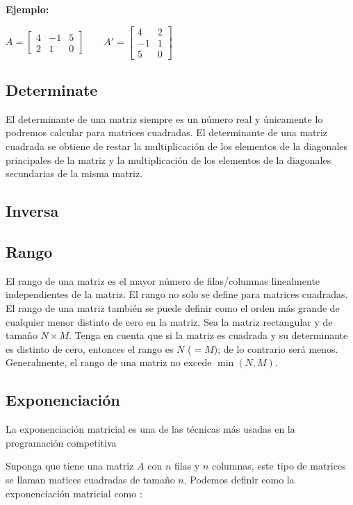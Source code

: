 \textbf{Ejemplo:}

$A=\begin{bmatrix} 
	4  & -1 & 5 \\ 
	2 & 1 & 0  
\end{bmatrix} \qquad   A'=\begin{bmatrix} 
 4  &  2 \\ 
-1  &  1 \\
 5  &  0 
\end{bmatrix} $

\subsection{Determinate}

El determinante de una matriz siempre es un número real y únicamente lo podremos calcular para matrices cuadradas. El determinante de una matriz cuadrada se obtiene de restar la multiplicación de los elementos de la diagonales principales de la matriz y la multiplicación de los elementos de la diagonales secundarias de la misma matriz.  

\subsection{Inversa}

\subsection{Rango}

El rango de una matriz es el mayor número de filas/columnas linealmente independientes de la matriz. 
El rango no solo se define para matrices cuadradas. El rango de una matriz también se puede definir 
como el orden más grande de cualquier menor distinto de cero en la matriz. Sea la matriz rectangular y 
de tamaño $N\times M$. Tenga en cuenta que si la matriz es cuadrada y su determinante es distinto de 
cero, entonces el rango es $N$ ($=M$); de lo contrario será menos. Generalmente, el rango de una 
matriz no excede $\min (N,M)$.

\subsection{Exponenciación}
La exponenciación matricial es una de las técnicas más usadas en la programación competitiva

Suponga que tiene una matriz $A$ con $n$ filas y $n$ columnas, este tipo de matrices se llaman matices cuadradas de tamaño $n$. Podemos definir como la exponenciación matricial como :

